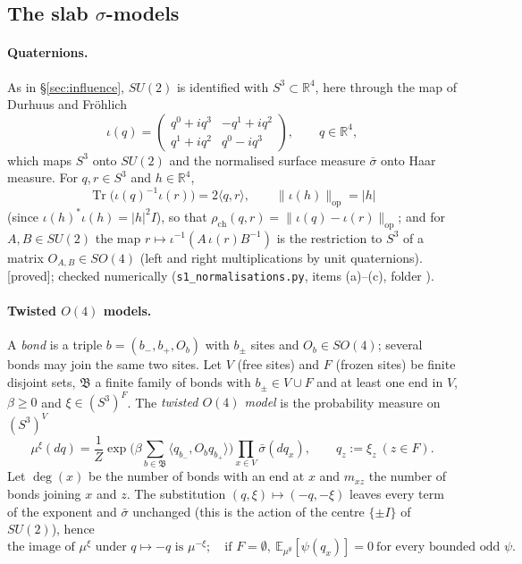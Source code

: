 \documentclass[11pt,a4paper]{article}
\theoremstyle{remark}
\theoremstyle{definition}
\theoremstyle{plain}
\theoremstyle{remark}
\newcommand{\R}{\mathbb{R}}
\newcommand{\E}{\mathbb{E}}
\newcommand{\st}[1]{\textsf{[#1]}}
\newcommand{\rch}{\rho_{\mathrm{ch}}}
\begin{document}
\subsection{The slab $\sigma$-models}\label{sec:slab}

\paragraph{Quaternions.} As in \S\ref{sec:influence}, $SU(2)$ is identified with $S^3\subset\R^4$, here through the map of Durhuus and Fr\"ohlich \cite[(5.1)]{DF80}
\[
\iota(q)=\begin{pmatrix}q^0+iq^3&-q^1+iq^2\\ q^1+iq^2&q^0-iq^3\end{pmatrix},\qquad q\in\R^4,
\]
which maps $S^3$ onto $SU(2)$ and the normalised surface measure $\bar\sigma$ onto Haar measure. For $q,r\in S^3$ and $h\in\R^4$,
\begin{equation}\label{eq:al-trace2}
\operatorname{Tr}\big(\iota(q)^{-1}\iota(r)\big)=2\langle q,r\rangle,\qquad\|\iota(h)\|_{\mathrm{op}}=|h|
\end{equation}
(since $\iota(h)^*\iota(h)=|h|^2I$), so that $\rch(q,r)=\|\iota(q)-\iota(r)\|_{\mathrm{op}}$; and for $A,B\in SU(2)$ the map $r\mapsto\iota^{-1}(A\,\iota(r)B^{-1})$ is the restriction to $S^3$ of a matrix $O_{A,B}\in SO(4)$ (left and right multiplications by unit quaternions). \st{proved}; checked numerically (\texttt{s1\_normalisations.py}, items (a)--(c), folder ).

\paragraph{Twisted $O(4)$ models.} A \emph{bond} is a triple $b=(b_-,b_+,O_b)$ with $b_\pm$ sites and $O_b\in SO(4)$; several bonds may join the same two sites. Let $V$ (free sites) and $F$ (frozen sites) be finite disjoint sets, $\mathfrak B$ a finite family of bonds with $b_\pm\in V\cup F$ and at least one end in $V$, $\beta\ge0$ and $\xi\in(S^3)^F$. The \emph{twisted $O(4)$ model} is the probability measure on $(S^3)^V$
\begin{equation}\label{eq:al-twisted}
\mu^\xi(dq)=\frac1Z\exp\Big(\beta\sum_{b\in\mathfrak B}\langle q_{b_-},O_bq_{b_+}\rangle\Big)\prod_{x\in V}\bar\sigma(dq_x),\qquad q_z:=\xi_z\ (z\in F).
\end{equation}
Let $\deg(x)$ be the number of bonds with an end at $x$ and $m_{xz}$ the number of bonds joining $x$ and $z$. The substitution $(q,\xi)\mapsto(-q,-\xi)$ leaves every term of the exponent and $\bar\sigma$ unchanged (this is the action of the centre $\{\pm I\}$ of $SU(2)$), hence
\begin{equation}\label{eq:al-centre}
\text{the image of }\mu^\xi\text{ under }q\mapsto-q\text{ is }\mu^{-\xi};\quad\text{if }F=\emptyset,\ \E_{\mu^\emptyset}[\psi(q_x)]=0\ \text{for every bounded odd }\psi.
\end{equation}
\end{document}
